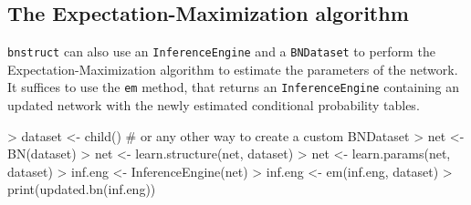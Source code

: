 \documentclass{article}
\newcommand{\Robject}[1]{{\texttt{#1}}}
\newcommand{\Rpackage}[1]{{\texttt{#1}}}
\newcommand{\Rmethod}[1]{{\texttt{#1}}}
\begin{document}
\subsection{The Expectation-Maximization algorithm}
\Rpackage{bnstruct} can also use an \Robject{InferenceEngine} and a \Robject{BNDataset} to perform
the Expectation-Maximization algorithm to estimate the parameters of the network.
It suffices to use the \Rmethod{em} method, that returns an \Robject{InferenceEngine} containing
an updated network with the newly estimated conditional probability tables.
\begin{Schunk}
\begin{Sinput}
> dataset <- child() # or any other way to create a custom BNDataset
> net     <- BN(dataset)
> net     <- learn.structure(net, dataset)
> net     <- learn.params(net, dataset)
> inf.eng <- InferenceEngine(net)
> inf.eng <- em(inf.eng, dataset)
> print(updated.bn(inf.eng))
\end{Sinput}
\end{Schunk}



\end{document}
